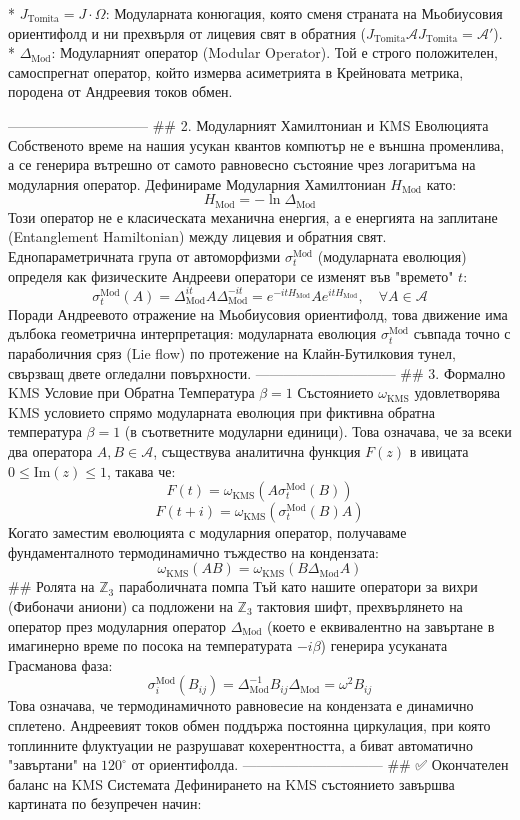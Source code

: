 * $J_{\text{Tomita}} = J \cdot \Omega$: Модуларната конюгация, която сменя страната на Мьобиусовия ориентифолд и ни прехвърля от лицевия свят в обратния ($J_{\text{Tomita}} \mathcal{A} J_{\text{Tomita}} = \mathcal{A}'$).
* $\Delta_{\text{Mod}}$: Модуларният оператор (Modular Operator). Той е строго положителен, самоспрегнат оператор, който измерва асиметрията в Крейновата метрика, породена от Андреевия токов обмен.

------------------------------
## 2. Модуларният Хамилтониан и KMS Еволюцията
Собственото време на нашия усукан квантов компютър не е външна променлива, а се генерира вътрешно от самото равновесно състояние чрез логаритъма на модуларния оператор. Дефинираме Модуларния Хамилтониан $H_{\text{Mod}}$ като:
$$H_{\text{Mod}} = - \ln \Delta_{\text{Mod}}$$ 
Този оператор не е класическата механична енергия, а е енергията на заплитане (Entanglement Hamiltonian) между лицевия и обратния свят. Еднопараметричната група от автоморфизми $\sigma_t^{\text{Mod}}$ (модуларната еволюция) определя как физическите Андрееви оператори се изменят във "времето" $t$:
$$\sigma_t^{\text{Mod}}(A) = \Delta_{\text{Mod}}^{it} A \Delta_{\text{Mod}}^{-it} = e^{-it H_{\text{Mod}}} A e^{it H_{\text{Mod}}}, \quad \forall A \in \mathcal{A}$$ 
Поради Андреевото отражение на Мьобиусовия ориентифолд, това движение има дълбока геометрична интерпретация: модуларната еволюция $\sigma_t^{\text{Mod}}$ съвпада точно с параболичния сряз (Lie flow) по протежение на Клайн-Бутилковия тунел, свързващ двете огледални повърхности.
------------------------------
## 3. Формално KMS Условие при Обратна Температура $\beta = 1$
Състоянието $\omega_{\text{KMS}}$ удовлетворява KMS условието спрямо модуларната еволюция при фиктивна обратна температура $\beta = 1$ (в съответните модуларни единици). Това означава, че за всеки два оператора $A, B \in \mathcal{A}$, съществува аналитична функция $F(z)$ в ивицата $0 \le \text{Im}(z) \le 1$, такава че:
$$F(t) = \omega_{\text{KMS}}(A \sigma_t^{\text{Mod}}(B))$$ 
$$F(t + i) = \omega_{\text{KMS}}(\sigma_t^{\text{Mod}}(B) A)$$ 
Когато заместим еволюцията с модуларния оператор, получаваме фундаменталното термодинамично тъждество на кондензата:
$$\omega_{\text{KMS}}(A B) = \omega_{\text{KMS}}(B \Delta_{\text{Mod}} A)$$ 
## Ролята на $\mathbb{Z}_3$ параболичната помпа
Тъй като нашите оператори за вихри (Фибоначи аниони) са подложени на $\mathbb{Z}_3$ тактовия шифт, прехвърлянето на оператор през модуларния оператор $\Delta_{\text{Mod}}$ (което е еквивалентно на завъртане в имагинерно време по посока на температурата $-i\beta$) генерира усуканата Грасманова фаза:
$$\sigma_{i}^{\text{Mod}}(B_{ij}) = \Delta_{\text{Mod}}^{-1} B_{ij} \Delta_{\text{Mod}} = \omega^2 B_{ij}$$ 
Това означава, че термодинамичното равновесие на кондензата е динамично сплетено. Андреевият токов обмен поддържа постоянна циркулация, при която топлинните флуктуации не разрушават кохерентността, а биват автоматично "завъртани" на $120^\circ$ от ориентифолда.
------------------------------
## ✅ Окончателен баланс на KMS Системата
Дефинирането на KMS състоянието завършва картината по безупречен начин:

